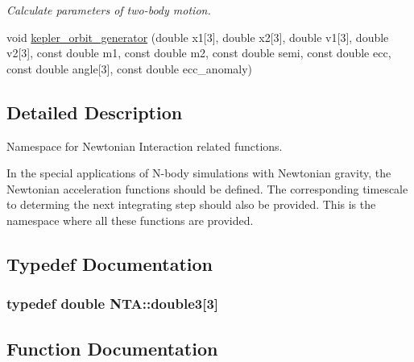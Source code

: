 \begin{DoxyCompactItemize}
\begin{DoxyCompactList}\small\item\em Calculate parameters of two-\/body motion. \end{DoxyCompactList}\item 
void \hyperlink{namespaceNTA_a621b3643cd91a5a7ea23b7b22481f121}{kepler\+\_\+orbit\+\_\+generator} (double x1\mbox{[}3\mbox{]}, double x2\mbox{[}3\mbox{]}, double v1\mbox{[}3\mbox{]}, double v2\mbox{[}3\mbox{]}, const double m1, const double m2, const double semi, const double ecc, const double angle\mbox{[}3\mbox{]}, const double ecc\+\_\+anomaly)
\end{DoxyCompactItemize}


\subsection{Detailed Description}
Namespace for Newtonian Interaction related functions. 

In the special applications of N-\/body simulations with Newtonian gravity, the Newtonian acceleration functions should be defined. The corresponding timescale to determing the next integrating step should also be provided. This is the namespace where all these functions are provided. 

\subsection{Typedef Documentation}
\subsubsection[{\texorpdfstring{double3}{double3}}]{\setlength{\rightskip}{0pt plus 5cm}typedef double N\+T\+A\+::double3\mbox{[}3\mbox{]}}\hypertarget{namespaceNTA_a19ccaac066849b26305dbbbee129fa0e}{}\label{namespaceNTA_a19ccaac066849b26305dbbbee129fa0e}


\subsection{Function Documentation}
